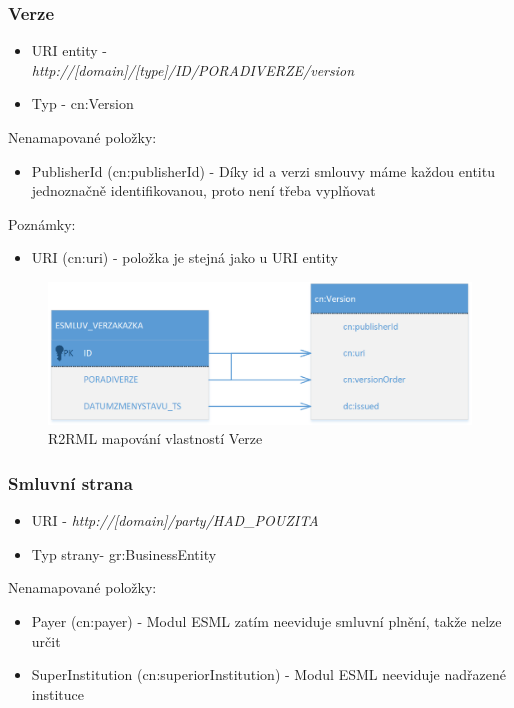 \subsubsection*{Verze}

\begin{itemize}
\item URI entity -\\\textit{http://[domain]/[type]/{ID}/{PORADIVERZE}/version}
\item Typ - cn:Version
\end{itemize}

Nenamapované položky:
\begin{itemize}
\item PublisherId (cn:publisherId) - Díky id a verzi smlouvy máme každou entitu jednoznačně identifikovanou, proto není třeba vyplňovat
\end{itemize}

Poznámky:
\begin{itemize}
\item URI (cn:uri) - položka je stejná jako u URI entity
\end{itemize}

\begin{figure}[H]
\centerline{\includegraphics[width=\textwidth]{img/mapVersion.eps}}
\caption{R2RML mapování vlastností Verze}
\label{obr:mapVersion}
\end{figure}

\subsubsection*{Smluvní strana}

\begin{itemize}
\item URI - \textit{http://[domain]/party/{HAD\_POUZITA}}
\item Typ strany- gr:BusinessEntity

\end{itemize}

Nenamapované položky:
\begin{itemize}
\item Payer (cn:payer) - Modul ESML zatím neeviduje smluvní plnění, takže nelze určit 
\item SuperInstitution (cn:superiorInstitution) - Modul ESML neeviduje nadřazené instituce
\end{itemize}

